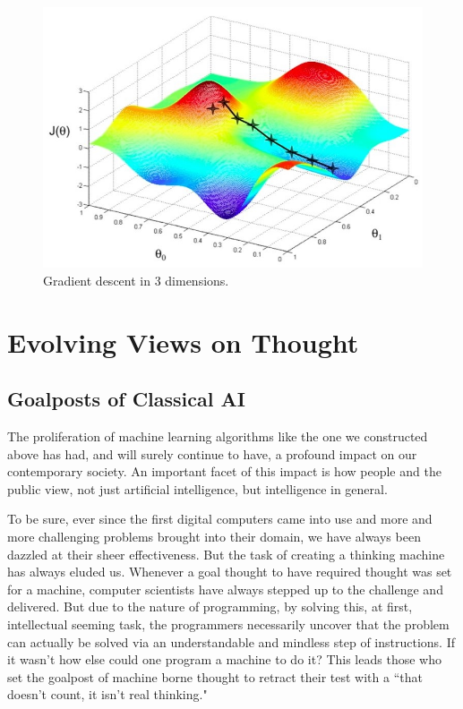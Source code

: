 \documentclass{article}
\begin{document}
\begin{figure}[h]
\centering
\includegraphics[width=.7\linewidth]{3d}
\caption*{Gradient descent in 3 dimensions.}
\end{figure}

\section{Evolving Views on Thought}
\subsection{Goalposts of Classical AI}
The proliferation of machine learning algorithms like the one we constructed above has had, and will surely continue to have, a profound impact on our contemporary society. An important facet of this impact is how people and the public view, not just artificial intelligence, but intelligence in general.

To be sure, ever since the first digital computers came into use and more and more challenging problems brought into their domain, we have always been dazzled at their sheer effectiveness. But the task of creating a thinking machine has always eluded us. Whenever a goal thought to have required thought was set for a machine, computer scientists have always stepped up to the challenge and delivered. But due to the nature of programming, by solving this, at first, intellectual seeming task, the programmers necessarily uncover that the problem can actually be solved via an understandable and mindless step of instructions. If it wasn't how else could one program a machine to do it? This leads those who set the goalpost of machine borne thought to retract their test with a ``that doesn't count, it isn't real thinking."
\end{document}
